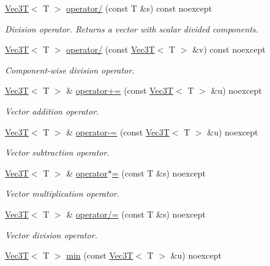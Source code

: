 \begin{DoxyCompactItemize}
\hyperlink{classVec3T}{Vec3T}$<$ T $>$ \hyperlink{classVec3T_acc5973c1c82e51c597b47ba39870f528}{operator/} (const T \&s) const noexcept
\begin{DoxyCompactList}\small\item\em Division operator. Returns a vector with scalar divided components. \end{DoxyCompactList}\item 
\hyperlink{classVec3T}{Vec3T}$<$ T $>$ \hyperlink{classVec3T_a3c48111d27fb16cc3304e7aa2b4603fc}{operator/} (const \hyperlink{classVec3T}{Vec3T}$<$ T $>$ \&v) const noexcept
\begin{DoxyCompactList}\small\item\em Component-\/wise division operator. \end{DoxyCompactList}\item 
\hyperlink{classVec3T}{Vec3T}$<$ T $>$ \& \hyperlink{classVec3T_a7d06c56d8579d8b3695f43f62544f999}{operator+=} (const \hyperlink{classVec3T}{Vec3T}$<$ T $>$ \&u) noexcept
\begin{DoxyCompactList}\small\item\em Vector addition operator. \end{DoxyCompactList}\item 
\hyperlink{classVec3T}{Vec3T}$<$ T $>$ \& \hyperlink{classVec3T_a8a580094450e167248f4ee089027fa40}{operator-\/=} (const \hyperlink{classVec3T}{Vec3T}$<$ T $>$ \&u) noexcept
\begin{DoxyCompactList}\small\item\em Vector subtraction operator. \end{DoxyCompactList}\item 
\hyperlink{classVec3T}{Vec3T}$<$ T $>$ \& \hyperlink{classVec3T_a0448e51b7f785b14df47092929cb73a3}{operator$\ast$=} (const T \&s) noexcept
\begin{DoxyCompactList}\small\item\em Vector multiplication operator. \end{DoxyCompactList}\item 
\hyperlink{classVec3T}{Vec3T}$<$ T $>$ \& \hyperlink{classVec3T_a9446e83162d3daee6133d12b354a3a41}{operator/=} (const T \&s) noexcept
\begin{DoxyCompactList}\small\item\em Vector division operator. \end{DoxyCompactList}\item 
\hyperlink{classVec3T}{Vec3T}$<$ T $>$ \hyperlink{classVec3T_ad0a0c9754ef8df1fa28abdaa01c246c4}{min} (const \hyperlink{classVec3T}{Vec3T}$<$ T $>$ \&u) noexcept

\end{DoxyCompactItemize}
